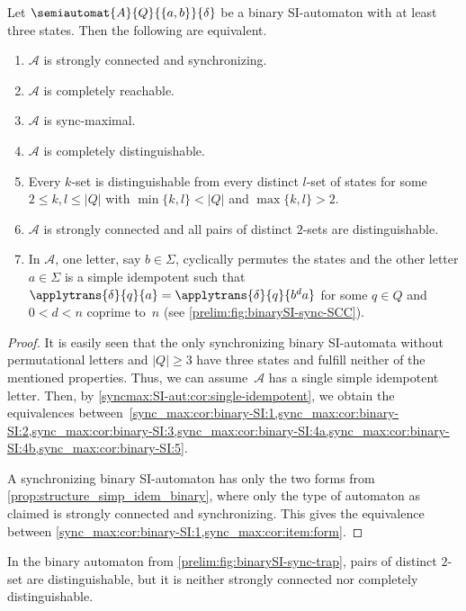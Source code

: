 \begin{corollary} \label{sync_max:prop:binary-SI}
	Let  $\semiautomat{A}{Q}{\{a,b\}}{\delta}$ be a binary SI-automaton with at least three states.
	Then the following are equivalent.
	
	\begin{enumerate}
		\item \label{sync_max:cor:binary-SI:1} $\mathcal A$ is strongly connected and synchronizing.
		
		\item \label{sync_max:cor:binary-SI:2} $\mathcal A$ is completely reachable.
		
		\item \label{sync_max:cor:binary-SI:3} $\mathcal A$ is sync-maximal.
		
		\item \label{sync_max:cor:binary-SI:4a} $\mathcal A$ is completely distinguishable.
		
		\item \label{sync_max:cor:binary-SI:4b} Every $k$-set is distinguishable from every distinct $l$-set of states for some $2 \le k, l \le |Q|$ with $\min\{k,l\} < |Q|$ and $\max\{k, l\} > 2$.
			
		\item \label{sync_max:cor:binary-SI:5} $\mathcal A$ is strongly connected and all pairs of distinct $2$-sets are distinguishable.
		
		\item \label{sync_max:cor:item:form} In $\mathcal A$, one letter, say $b \in \Sigma$, cyclically permutes
		the states and the other letter $a \in \Sigma$
		is a simple idempotent 
		such that $\applytrans{\delta}{q}{a} = \applytrans{\delta}{q}{b^d a}$
		for some $q \in Q$ and $0 < d < n$ coprime to~$n$ (see \cref{prelim:fig:binarySI-sync-SCC}).
	\end{enumerate}
\end{corollary} 
\begin{proof}
	It is easily seen that the only synchronizing binary SI-automata
	without permutational letters and $|Q| \ge 3$
	have three states and fulfill neither of the
	mentioned properties. Thus, we can assume~$\mathcal A$
	has a single simple idempotent letter.
	Then, by \cref{syncmax:SI-aut:cor:single-idempotent},
	we obtain the equivalences
	between~\cref{sync_max:cor:binary-SI:1,sync_max:cor:binary-SI:2,sync_max:cor:binary-SI:3,sync_max:cor:binary-SI:4a,sync_max:cor:binary-SI:4b,sync_max:cor:binary-SI:5}.
	
	A synchronizing binary SI-automaton has
	only the two forms from \cref{prop:structure_simp_idem_binary},
	where only the type of automaton as claimed 
	is strongly connected and synchronizing. 
	This gives the equivalence between \cref{sync_max:cor:binary-SI:1,sync_max:cor:item:form}.
\end{proof}

In the binary automaton from \cref{prelim:fig:binarySI-sync-trap},
pairs of distinct $2$-set are distinguishable, 
but it is neither strongly connected nor completely distinguishable.